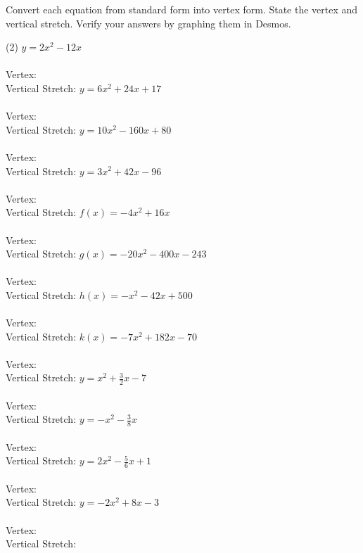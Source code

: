 \documentclass[12pt,fleqn]{book}
\newcommand{\prb}[1]{\begin{Exercise}#1\end{Exercise}}
\begin{document}
\prb{Convert each equation from standard form into vertex form.  State the vertex and vertical stretch.  Verify your answers by graphing them in Desmos.
	\begin{tasks}(2)
		\task $y=2 x^2-12 x$\\[10em]
		\\Vertex:
		\\Vertical Stretch:
		\task $y=6 x^2+24 x+17$\\[10em]
		\\Vertex:
		\\Vertical Stretch:
		\task $y=10 x^2-160 x+80$\\[10em]
		\\Vertex:
		\\Vertical Stretch:
		\task $y=3 x^2+42 x-96$\\[10em]
		\\Vertex:
		\\Vertical Stretch:
		\task $f(x)=-4 x^2+16 x$\\[10em]
		\\Vertex:
		\\Vertical Stretch:
		\task $g(x)=-20 x^2-400 x-243$\\[10em]
		\\Vertex:
		\\Vertical Stretch:
		\task $h(x)=-x^2-42 x+500$\\[10em]
		\\Vertex:
		\\Vertical Stretch:
		\task $k(x)=-7 x^2+182 x-70$\\[10em]
		\\Vertex:
		\\Vertical Stretch:
		\task $y=x^2+\frac{3}{2} x-7$\\[10em]
		\\Vertex:
		\\Vertical Stretch:
		\task $y=-x^2-\frac{3}{8} x$\\[10em]
		\\Vertex:
		\\Vertical Stretch:
		\task $y=2 x^2-\frac{5}{6} x+1$\\[10em]
		\\Vertex:
		\\Vertical Stretch:
		\task $y=-2 x^2+8 x-3$\\[10em]
		\\Vertex:
		\\Vertical Stretch:
	\end{tasks}
}
\end{document}
